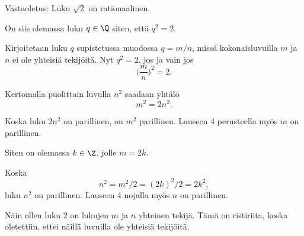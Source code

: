
\begin{todistus}
Vastaoletus: Luku $\sqrt{2}$ on rationaalinen.

On siis olemassa luku $q\in \Q$ siten, että $q^2=2$.

Kirjoitetaan luku $q$ supistetussa muodossa $q=m/n$, missä kokonaisluvuilla $m$ ja $n$ ei ole yhteisiä tekijöitä. Nyt $q^2=2$, jos ja vain jos
\[
\bigg(\frac{m}{n}\bigg)^2=2.
\]

Kertomalla puolittain luvulla $n^2$ saadaan yhtälö
\[
m^2 = 2n^2.
\]

Koska luku $2n^2$ on parillinen, on $m^2$ parillinen. Lauseen 4 perusteella myös $m$ on parillinen.

Siten on olemassa $k\in \Z$, jolle $m=2k$.

Koska
\[
n^2=m^2/2=(2k)^2/2= 2k^2,
\]
luku $n^2$ on parillinen. Lauseen 4 nojalla myös $n$ on parillinen.

Näin ollen luku $2$ on lukujen $m$ ja $n$ yhteinen tekijä. Tämä on ristiriita, koska oletettiin, ettei näillä luvuilla ole yhteisiä tekijöitä.
\end{todistus}



\Harjoitustehtavat

